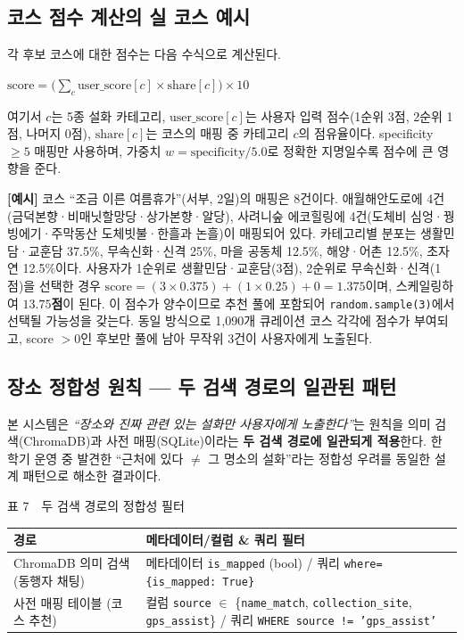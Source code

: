 \documentclass[10pt,twocolumn,a4paper]{article}
\begin{document}
\subsection{코스 점수 계산의 실 코스 예시}

각 후보 코스에 대한 점수는 다음 수식으로 계산된다.

\begin{center}
\(\mathrm{score} = \big(\sum_c \mathrm{user\_score}[c] \times \mathrm{share}[c]\big) \times 10\)
\end{center}

\noindent 여기서 $c$는 5종 설화 카테고리, $\mathrm{user\_score}[c]$는 사용자
입력 점수(1순위 3점, 2순위 1점, 나머지 0점), $\mathrm{share}[c]$는 코스의
매핑 중 카테고리 $c$의 점유율이다. specificity $\ge 5$ 매핑만 사용하며,
가중치 $w = \mathrm{specificity}/5.0$로 정확한 지명일수록 점수에 큰 영향을
준다.

\textbf{[예시]} 코스 ``조금 이른 여름휴가''(서부, 2일)의 매핑은 8건이다.
애월해안도로에 4건(금덕본향·비매닛할망당·상가본향·알당), 사려니숲 에코힐링에
4건(도체비 심엉·꿩빙에기·주막동산 도체빗불·한흘과 논흘)이 매핑되어 있다.
카테고리별 분포는 생활민담·교훈담 37.5\%, 무속신화·신격 25\%, 마을 공동체
12.5\%, 해양·어촌 12.5\%, 초자연 12.5\%이다. 사용자가 1순위로
생활민담·교훈담(3점), 2순위로 무속신화·신격(1점)을 선택한 경우
$\mathrm{score} = (3 \times 0.375) + (1 \times 0.25) + 0 = 1.375$이며,
스케일링하여 $\mathbf{13.75}$\textbf{점}이 된다. 이 점수가 양수이므로 추천
풀에 포함되어 \texttt{random.sample(3)}에서 선택될 가능성을 갖는다. 동일
방식으로 1{,}090개 큐레이션 코스 각각에 점수가 부여되고, score $> 0$인
후보만 풀에 남아 무작위 3건이 사용자에게 노출된다.

\subsection{장소 정합성 원칙 --- 두 검색 경로의 일관된 패턴}

본 시스템은 \emph{``장소와 진짜 관련 있는 설화만 사용자에게 노출한다''}는
원칙을 의미 검색(ChromaDB)과 사전 매핑(SQLite)이라는 \textbf{두 검색 경로에
일관되게 적용}한다. 한 학기 운영 중 발견한 ``근처에 있다 $\ne$ 그 명소의
설화''라는 정합성 우려를 동일한 설계 패턴으로 해소한 결과이다.

\begin{table}[H]
\centering
{\small 표 7~~두 검색 경로의 정합성 필터}
\label{tab:integrity}
\vspace{2pt}

\footnotesize
\begin{tabularx}{\columnwidth}{p{}X}
\toprule
경로 & 메타데이터/컬럼 \& 쿼리 필터 \\
\midrule
ChromaDB 의미 검색
(동행자 채팅) &
메타데이터 \texttt{is\_mapped} (bool) /
쿼리 \texttt{where=\{is\_mapped: True\}} \\
\addlinespace[2pt]
사전 매핑 테이블
(코스 추천) &
컬럼 \texttt{source} $\in$ \{\texttt{name\_match},
\texttt{collection\_site}, \texttt{gps\_assist}\} /
쿼리 \texttt{WHERE source != 'gps\_assist'} \\
\bottomrule
\end{tabularx}
\end{table}
\end{document}
